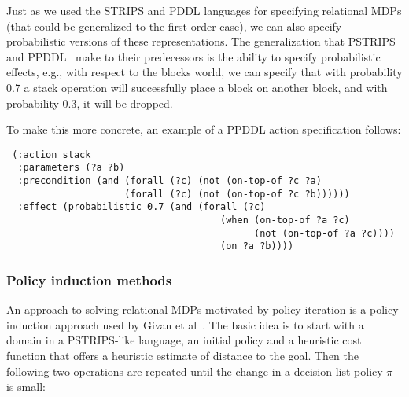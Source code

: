 Just as we used the STRIPS and PDDL languages for specifying
relational MDPs (that could be generalized to the first-order case),
we can also specify probabilistic versions of these representations.
The generalization that PSTRIPS~\cite{bout-dean-hanks} and PPDDL~\cite{ppddl} make to their predecessors is the
ability to specify probabilistic effects, e.g., with respect to the
blocks world, we can specify that with probability 0.7 a stack operation
will successfully place a block on another block,
and with probability 0.3, it will be dropped.

To make this more concrete, an example of a PPDDL action specification follows:

\begin{verbatim}
 (:action stack
  :parameters (?a ?b)
  :precondition (and (forall (?c) (not (on-top-of ?c ?a)
                     (forall (?c) (not (on-top-of ?c ?b))))))
  :effect (probabilistic 0.7 (and (forall (?c)
                                      (when (on-top-of ?a ?c)
                                            (not (on-top-of ?a ?c))))
                                      (on ?a ?b))))
\end{verbatim}



\subsubsection{Policy induction methods}

An approach to solving relational MDPs motivated by policy iteration
is a policy induction approach used by Givan et al~\cite{givan:uai02,givan:nips03}.  The
basic idea is to start with a domain in a PSTRIPS-like language, 
an initial policy and a heuristic cost
function that offers a heuristic estimate of distance to the goal.
Then the following two operations are repeated until the change in
a decision-list policy $\pi$ is small:

